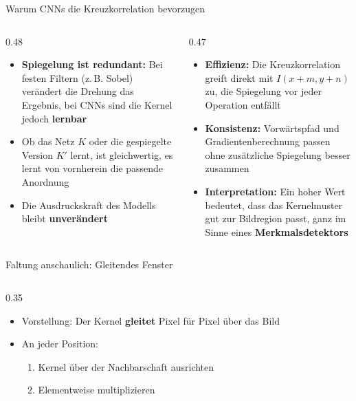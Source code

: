 {%
\begin{frame}{Warum CNNs die Kreuzkorrelation bevorzugen}
\begin{columns}
\begin{column}{0.48\textwidth}
\begin{itemize}
    \item \textbf{Spiegelung ist redundant:} Bei festen Filtern (z.\,B. Sobel) verändert die Drehung das Ergebnis, bei CNNs sind die Kernel jedoch \textbf{lernbar}
    \item Ob das Netz $K$ oder die gespiegelte Version $K'$ lernt, ist gleichwertig, es lernt von vornherein die passende Anordnung
    \item Die Ausdruckskraft des Modells bleibt \textbf{unverändert}
\end{itemize}
\end{column}
\begin{column}{0.47\textwidth}
\begin{itemize}
    \item \textbf{Effizienz:} Die Kreuzkorrelation greift direkt mit $I(x+m, y+n)$ zu, die Spiegelung vor jeder Operation entfällt
    \item \textbf{Konsistenz:} Vorwärtspfad und Gradientenberechnung passen ohne zusätzliche Spiegelung besser zusammen
    \item \textbf{Interpretation:} Ein hoher Wert bedeutet, dass das Kernelmuster gut zur Bildregion passt, ganz im Sinne eines \textbf{Merkmalsdetektors}
\end{itemize}
\end{column}
\end{columns}
\end{frame}
\begin{frame}{Faltung anschaulich: Gleitendes Fenster}
\begin{columns}
\begin{column}{0.35\textwidth}
\begin{itemize}
    \item Vorstellung: Der Kernel \textbf{gleitet} Pixel für Pixel über das Bild
    \item An jeder Position:
    \begin{enumerate}
        \item Kernel über der Nachbarschaft ausrichten
        \item Elementweise multiplizieren

\end{enumerate}
\end{itemize}
\end{column}
\end{columns}
\end{frame}}
